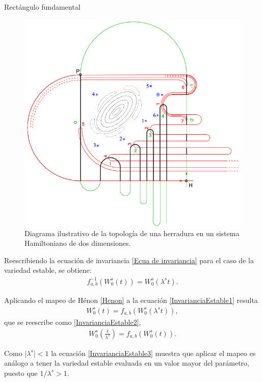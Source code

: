 \documentclass[11pt]{beamer}
\theoremstyle{definition}
\begin{document}
\begin{frame}{Rect\'angulo fundamental}

\begin{figure}
\centering
\includegraphics[scale=0.27]{herradura}
\caption{Diagrama ilustrativo de la topología de una herradura en un sistema Hamiltoniano de dos dimensiones.\cite{Merlo} }
\label{herradura}
\end{figure}

\end{frame}
\begin{frame}
Reescribiendo la ecuación de invariancia \eqref{Ecua de invariancia} para el caso de la variedad estable, se obtiene:
\begin{eqnarray}
f_{a,b}^{-1}(W_{0}^{s}(t))=W_{0}^{s}(\lambda^{s}t).
\label{InvarianciaEstable1}
\end{eqnarray}

Aplicando el mapeo de Hénon  \eqref{Henon} a la ecuación \eqref{InvarianciaEstable1} resulta
\begin{eqnarray}
W_{0}^{s}(t)=f_{a,b}(W_{0}^{s}(\lambda^{s}t)),
\label{InvarianciaEstable2}
\end{eqnarray}
que se reescribe como \eqref{InvarianciaEstable2}, 
\begin{eqnarray}
W_{0}^{s}\left(\frac{t}{\lambda^{s}}\right)=f_{a,b}(W_{0}^{s}(t)).
\label{InvarianciaEstable3}
\end{eqnarray}

Como $\vert \lambda^{s} \vert < 1 $ la ecuación \eqref{InvarianciaEstable3} muestra que aplicar el mapeo es análogo a tener la variedad estable evaluada en un valor mayor del parámetro, puesto que $1/\lambda^{s}>1$. 
\end{frame}
\end{document}
